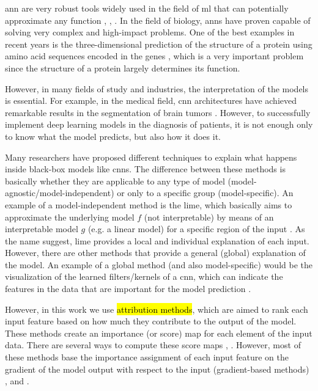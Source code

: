 
\glsresetall

\gls{ann} are very robust tools widely used in the field of \gls{ml} that can potentially approximate any function \cite{cybenko1989approximation}, \cite{hornik1989multilayer}, \cite{funahashi1989approximate}.
In the field of biology, \glspl{ann} have proven capable of solving very complex and high-impact problems. 
One of the best examples in recent years is the three-dimensional prediction of the structure of a protein using amino acid sequences encoded in the genes \cite{AlphaFold}, which is a very important problem since the structure of a protein largely determines its function.

However, in many fields of study and industries, the interpretation of the models is essential. For example, in the medical field, \gls{cnn} architectures have achieved remarkable results in the segmentation of brain tumors \cite{saleem2021visual}. However, to successfully implement deep learning models in the diagnosis of patients, it is not enough only to know what the model predicts, but also how it does it.

Many researchers have proposed different techniques to explain what happens inside black-box models like \glspl{cnn}. 
The difference between these methods is basically whether they are applicable to any type of model (model-agnostic/model-independent) or only to a specific group (model-specific).
An example of a model-independent method is the \gls{lime}, which basically aims to approximate the underlying model $f$ (not interpretable) by means of an interpretable model $g$ (e.g. a linear model) for a specific region of the input \cite{ribeiro2016model}. As the name suggest, \gls{lime} provides a local and individual explanation of each input.
However, there are other methods that provide a general (global) explanation of the model. An example of a global method (and also model-specific) would be the visualization of the learned filters/kernels of a \gls{cnn}, which can indicate the features in the data that are important for the model prediction \cite{zeiler2014visualizing}. 

However, in this work we use \hl{attribution methods}, which are aimed to rank each input feature based on how much they contribute to the output of the model. 
These methods create an importance (or score) map for each element of the input data. There are several ways to compute these score maps \cite{JMLR:v11:baehrens10a}, \cite{ShrikumarGSK16}. However, most of these methods base the importance assignment of each input feature on the gradient of the model output with respect to the input (gradient-based methods) \cite{SimonyanVZ13}, \cite{BinderMBMS16} and \cite{Springenberg}.


